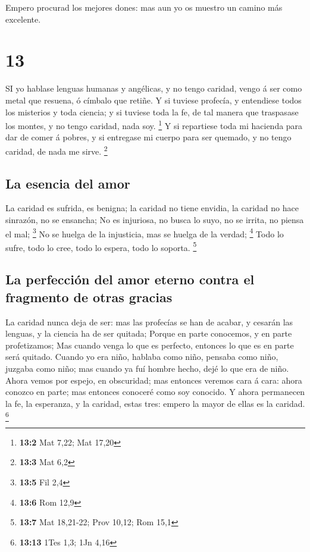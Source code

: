 Empero procurad los mejores dones: mas aun yo os muestro
un camino más excelente.

\hypertarget{section-12}{%
\section{13}\label{section-12}}

 SI yo hablase lenguas humanas y angélicas, y no tengo
caridad, vengo á ser como metal que resuena, ó címbalo que retiñe.
 Y si tuviese profecía, y entendiese todos los misterios y
toda ciencia; y si tuviese toda la fe, de tal manera que traspasase los
montes, y no tengo caridad, nada soy. \footnote{\textbf{13:2} Mat 7,22;
  Mat 17,20}  Y si repartiese toda mi hacienda para dar de
comer á pobres, y si entregase mi cuerpo para ser quemado, y no tengo
caridad, de nada me sirve. \footnote{\textbf{13:3} Mat 6,2}

\hypertarget{la-esencia-del-amor}{%
\subsection{La esencia del amor}\label{la-esencia-del-amor}}

 La caridad es sufrida, es benigna; la caridad no tiene
envidia, la caridad no hace sinrazón, no se ensancha;  No es
injuriosa, no busca lo suyo, no se irrita, no piensa el mal; \footnote{\textbf{13:5}
  Fil 2,4}  No se huelga de la injusticia, mas se huelga de
la verdad; \footnote{\textbf{13:6} Rom 12,9}  Todo lo sufre,
todo lo cree, todo lo espera, todo lo soporta. \footnote{\textbf{13:7}
  Mat 18,21-22; Prov 10,12; Rom 15,1}

\hypertarget{la-perfecciuxf3n-del-amor-eterno-contra-el-fragmento-de-otras-gracias}{%
\subsection{La perfección del amor eterno contra el fragmento de otras
gracias}\label{la-perfecciuxf3n-del-amor-eterno-contra-el-fragmento-de-otras-gracias}}

 La caridad nunca deja de ser: mas las profecías se han de
acabar, y cesarán las lenguas, y la ciencia ha de ser quitada;
 Porque en parte conocemos, y en parte profetizamos;
 Mas cuando venga lo que es perfecto, entonces lo que es en
parte será quitado.  Cuando yo era niño, hablaba como niño,
pensaba como niño, juzgaba como niño; mas cuando ya fuí hombre hecho,
dejé lo que era de niño.  Ahora vemos por espejo, en
obscuridad; mas entonces veremos cara á cara: ahora conozco en parte;
mas entonces conoceré como soy conocido.  Y ahora
permanecen la fe, la esperanza, y la caridad, estas tres: empero la
mayor de ellas es la caridad. \footnote{\textbf{13:13} 1Tes 1,3; 1Jn
  4,16}

